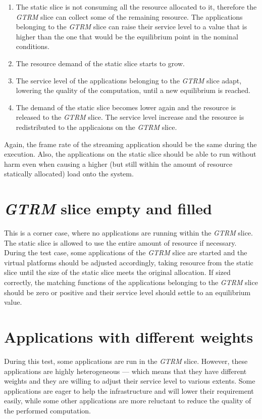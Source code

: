 \documentclass[nobiblatex]{LTHthesis}
\begin{document}
\begin{enumerate}
\item The static slice is not consuming all the resource allocated to it,
  therefore the \emph{GTRM} slice can collect some of the remaining resource. The
  applications belonging to the \emph{GTRM} slice can raise their service level to
  a value that is higher than the one that would be the equilibrium point
  in the nominal conditions.
\item The resource demand of the static slice starts to grow.
\item The service level of the applications belonging to the \emph{GTRM} slice
  adapt, lowering the quality of the computation, until a new equilibrium
  is reached.
\item The demand of the static slice becomes lower again and the resource
  is released to the \emph{GTRM} slice. The service level increase and the resource
  is redistributed to the applicaions on the \emph{GTRM} slice.
\end{enumerate}

Again, the frame rate of the streaming application should be the same
during the execution. Also, the applications on the static slice should be
able to run without harm even when causing a higher (but still within the
amount of resource statically allocated) load onto the system.

\section{\emph{GTRM} slice empty and filled}

This is a corner case, where no applications are running within the \emph{GTRM}
slice. The static slice is allowed to use the entire amount of resource if
necessary. During the test case, some applications of the \emph{GTRM} slice are
started and the virtual platforms should be adjusted accordingly, taking
resource from the static slice until the size of the static slice meets
the original allocation. If sized correctly, the matching functions of the
applications belonging to the \emph{GTRM} slice should be zero or positive and
their service level should settle to an equilibrium value.

\section{Applications with different weights}

During this test, some applications are run in the \emph{GTRM} slice. However, these
applications are highly heterogeneous --- which means that they have different
weights and they are willing to adjust their service level to various extents.
Some applications are eager to help the infrastructure and will lower their
requirement easily, while some other applications are more reluctant to
reduce the quality of the performed computation.
\end{document}
